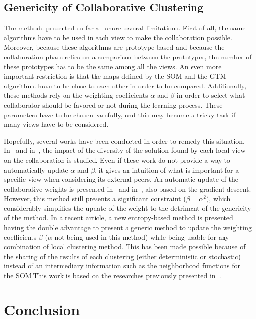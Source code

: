     \subsection{Genericity of Collaborative Clustering}
\label{sec:survey_limitations}

    The methods presented so far all share several limitations. First of all, the same algorithms have to be used in each view to make the collaboration possible. Moreover, because these algorithms are prototype based and because the collaboration phase relies on a comparison between the prototypes, the number of these prototypes has to be the same among all the views. An even more important restriction is that the maps defined by the SOM and the GTM algorithms have to be close to each other in order to be compared. Additionally, these methods rely on the weighting coefficients $\alpha$ and $\beta$ in order to select what collaborator should be favored or not during the learning process. These parameters have to be chosen carefully, and this may become a tricky task if many views have to be considered.

    Hopefully, several works have been conducted in order to remedy this situation. In~\cite{grozavu2014diversity} and in~\cite{rastin2015collaborative}, the impact of the diversity of the solution found by each local view on the collaboration is studied. Even if these work do not provide a way to automatically update $\alpha$ and $\beta$, it gives an intuition of what is important for a specific view when considering its external peers. An automatic update of the collaborative weights is presented in~\cite{grozavu2010topological} and in~\cite{grozavu2011learning}, also based on the gradient descent. However, this method still presents a significant constraint ($\beta = \alpha^2)$, which considerably simplifies the update of the weight to the detriment of the genericity of the method. In a recent article, a new entropy-based method is presented~\cite{sublime2018optimizing} having the double advantage to present a generic method to update the weighting coefficients $\beta$ ($\alpha$ not being used in this method) while being usable for any combination of local clustering method. This has been made possible because of the sharing of the results of each clustering (either deterministic or stochastic) instead of an intermediary information such as the neighborhood functions for the SOM.\@ This work is based on the researches previously presented in~\cite{sublime2016contributions}.

    \section{Conclusion}

